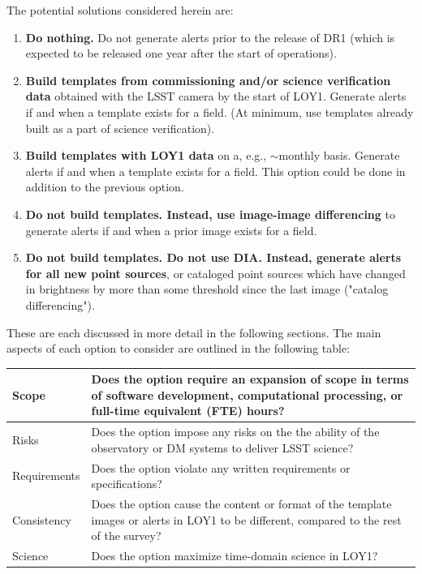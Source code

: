 \documentclass[DM,toc]{lsstdoc}
\begin{document}
The potential solutions considered herein are:
\begin{enumerate}
\item {\bf Do nothing.} Do not generate alerts prior to the release of DR1 (which is expected to be released one year after the start of operations).
\item {\bf Build templates from commissioning and/or science verification data} obtained with the LSST camera by the start of LOY1. Generate alerts if and when a template exists for a field. (At minimum, use templates already built as a part of science verification).
\item {\bf Build templates with LOY1 data} on a, e.g., $\sim$monthly basis. Generate alerts if and when a template exists for a field. This option could be done in addition to the previous option.
\item {\bf Do not build templates. Instead, use image-image differencing} to generate alerts if and when a prior image exists for a field.
\item {\bf Do not build templates. Do not use DIA. Instead, generate alerts for all new point sources}, or cataloged point sources which have changed in brightness by more than some threshold since the last image ("catalog differencing").
\end{enumerate}

These are each discussed in more detail in the following sections.
The main aspects of each option to consider are outlined in the following table:
\begin{center}
\begin{tabular}{|p{2.5cm}|p{13cm}|}
\hline
Scope & Does the option require an expansion of scope in terms of software development, computational processing, or full-time equivalent (FTE) hours? \\
\hline
Risks & Does the option impose any risks on the the ability of the observatory or DM systems to deliver LSST science?  \\
\hline
Requirements & Does the option violate any written requirements or specifications? \\
\hline
Consistency & Does the option cause the content or format of the template images or alerts in LOY1 to be different, compared to the rest of the survey? \\
\hline
Science & Does the option maximize time-domain science in LOY1? \\
\hline
\end{tabular}
\end{center}
\end{document}
